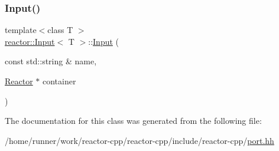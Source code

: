 \subsubsection{\texorpdfstring{Input()}{Input()}}
{\footnotesize\ttfamily template$<$class T $>$ \\
\hyperlink{classreactor_1_1Input}{reactor\+::\+Input}$<$ T $>$\+::\hyperlink{classreactor_1_1Input}{Input} (\begin{DoxyParamCaption}\item[{const std\+::string \&}]{name,  }\item[{\hyperlink{classreactor_1_1Reactor}{Reactor} $\ast$}]{container }\end{DoxyParamCaption})\hspace{0.3cm}{\ttfamily [inline]}}



The documentation for this class was generated from the following file\+:\begin{DoxyCompactItemize}
\item 
/home/runner/work/reactor-\/cpp/reactor-\/cpp/include/reactor-\/cpp/\hyperlink{port_8hh}{port.\+hh}\end{DoxyCompactItemize}
